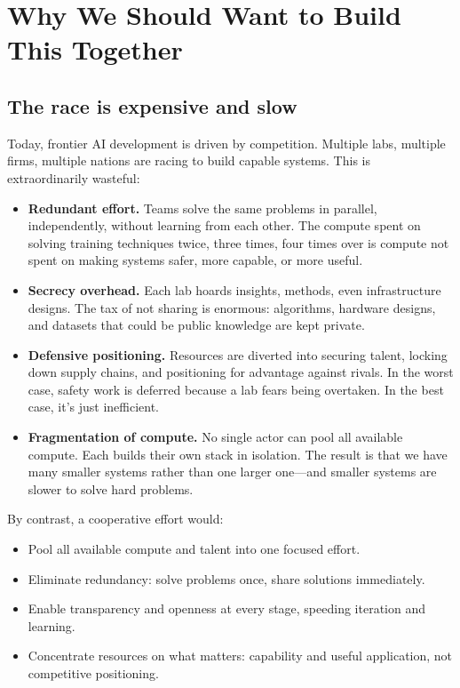\documentclass[12pt]{article}
\begin{document}
\clearpage
\tableofcontents
\clearpage

\section{Why We Should Want to Build This Together}
\label{sec:why}

\subsection{The race is expensive and slow}

Today, frontier AI development is driven by competition. Multiple labs, multiple
firms, multiple nations are racing to build capable systems. This is
extraordinarily wasteful:

\begin{itemize}[leftmargin=1.6em,itemsep=4pt]
  \item \textbf{Redundant effort.} Teams solve the same problems in parallel,
  independently, without learning from each other. The compute spent on solving
  training techniques twice, three times, four times over is compute not spent
  on making systems safer, more capable, or more useful.
  \item \textbf{Secrecy overhead.} Each lab hoards insights, methods, even
  infrastructure designs. The tax of not sharing is enormous: algorithms,
  hardware designs, and datasets that could be public knowledge are kept private.
  \item \textbf{Defensive positioning.} Resources are diverted into securing
  talent, locking down supply chains, and positioning for advantage against
  rivals. In the worst case, safety work is deferred because a lab fears being
  overtaken. In the best case, it's just inefficient.
  \item \textbf{Fragmentation of compute.} No single actor can pool all
  available compute. Each builds their own stack in isolation. The result is
  that we have many smaller systems rather than one larger one---and smaller
  systems are slower to solve hard problems.
\end{itemize}

\noindent By contrast, a cooperative effort would:
\begin{itemize}[leftmargin=1.6em,itemsep=4pt]
  \item Pool all available compute and talent into one focused effort.
  \item Eliminate redundancy: solve problems once, share solutions immediately.
  \item Enable transparency and openness at every stage, speeding iteration and
  learning.
  \item Concentrate resources on what matters: capability and useful application,
  not competitive positioning.
\end{itemize}
\end{document}
